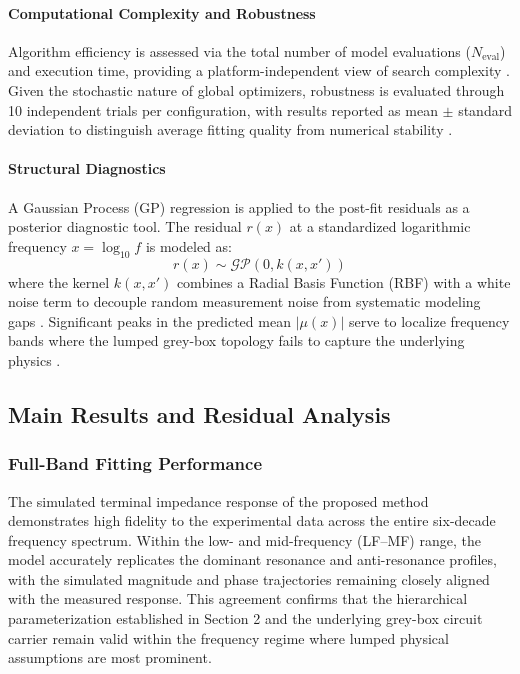 \documentclass[12pt,a4paper]{article}
\begin{document}
\paragraph{Computational Complexity and Robustness}
Algorithm efficiency is assessed via the total number of model evaluations ($N_{\text{eval}}$) and execution time, providing a platform-independent view of search complexity . Given the stochastic nature of global optimizers, robustness is evaluated through 10 independent trials per configuration, with results reported as mean $\pm$ standard deviation to distinguish average fitting quality from numerical stability .

\paragraph{Structural Diagnostics}
A Gaussian Process (GP) regression is applied to the post-fit residuals as a posterior diagnostic tool. The residual $r(x)$ at a standardized logarithmic frequency $x = \log_{10}f$ is modeled as:
\begin{equation}
r(x) \sim \mathcal{GP}(0, k(x, x'))
\end{equation}
where the kernel $k(x, x')$ combines a Radial Basis Function (RBF) with a white noise term to decouple random measurement noise from systematic modeling gaps . Significant peaks in the predicted mean $|\mu(x)|$ serve to localize frequency bands where the lumped grey-box topology fails to capture the underlying physics .

\subsection{Main Results and Residual Analysis}

\subsubsection{Full-Band Fitting Performance}

The simulated terminal impedance response of the proposed method demonstrates high fidelity to the experimental data across the entire six-decade frequency spectrum. Within the low- and mid-frequency (LF–MF) range, the model accurately replicates the dominant resonance and anti-resonance profiles, with the simulated magnitude and phase trajectories remaining closely aligned with the measured response. This agreement confirms that the hierarchical parameterization established in Section 2 and the underlying grey-box circuit carrier remain valid within the frequency regime where lumped physical assumptions are most prominent.
\end{document}
